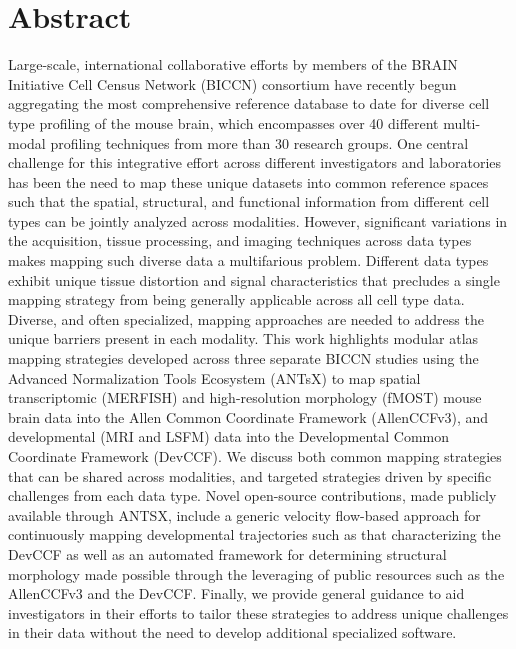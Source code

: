 \documentclass[
  12pt,
]{article}
\begin{document}
\normalsize

\newpage


\section*{Abstract}\label{abstract}

Large-scale, international collaborative efforts by members of the BRAIN
Initiative Cell Census Network (BICCN) consortium have recently begun
aggregating the most comprehensive reference database to date for
diverse cell type profiling of the mouse brain, which encompasses over
40 different multi-modal profiling techniques from more than 30 research
groups. One central challenge for this integrative effort across
different investigators and laboratories has been the need to map these
unique datasets into common reference spaces such that the spatial,
structural, and functional information from different cell types can be
jointly analyzed across modalities. However, significant variations in
the acquisition, tissue processing, and imaging techniques across data
types makes mapping such diverse data a multifarious problem. Different
data types exhibit unique tissue distortion and signal characteristics
that precludes a single mapping strategy from being generally applicable
across all cell type data. Diverse, and often specialized, mapping
approaches are needed to address the unique barriers present in each
modality. This work highlights modular atlas mapping strategies
developed across three separate BICCN studies using the Advanced
Normalization Tools Ecosystem (ANTsX) to map spatial transcriptomic
(MERFISH) and high-resolution morphology (fMOST) mouse brain data into
the Allen Common Coordinate Framework (AllenCCFv3), and developmental
(MRI and LSFM) data into the Developmental Common Coordinate Framework
(DevCCF). We discuss both common mapping strategies that can be shared
across modalities, and targeted strategies driven by specific challenges
from each data type. Novel open-source contributions, made publicly
available through ANTSX, include a generic velocity flow-based approach
for continuously mapping developmental trajectories such as that
characterizing the DevCCF as well as an automated framework for
determining structural morphology made possible through the leveraging
of public resources such as the AllenCCFv3 and the DevCCF. Finally, we
provide general guidance to aid investigators in their efforts to tailor
these strategies to address unique challenges in their data without the
need to develop additional specialized software.
\end{document}
